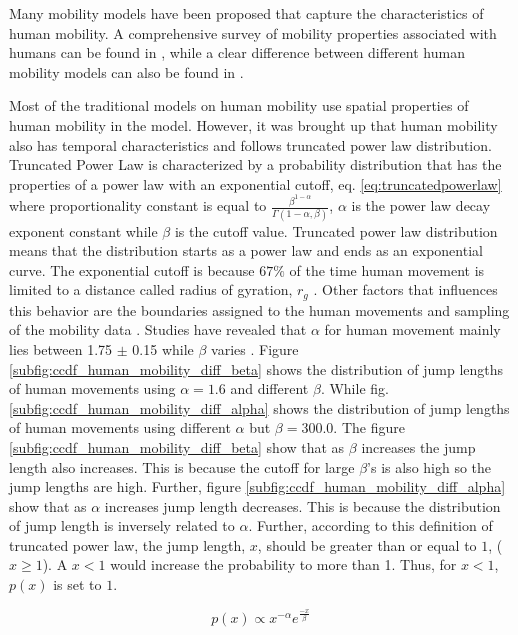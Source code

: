 \documentclass[preprint, twocolumn,5p]{elsarticle}
\begin{document}
    Many mobility models have been proposed that capture the characteristics of human mobility. A comprehensive survey of mobility properties associated with humans can be found in \cite{Karamshuk2011,Roy2011}, while a clear difference between different human mobility models can also be found in \cite{Karamshuk2011}.

    Most of the traditional models on human mobility use spatial properties of human mobility in the model. However, it was brought up that human mobility also has temporal characteristics and follows truncated power law distribution. Truncated Power Law is characterized by a probability distribution that has the properties of a power law with an exponential cutoff, eq. \ref{eq:truncatedpowerlaw} where proportionality constant is equal to $\frac{\beta^{1-\alpha}}{\Gamma(1-\alpha,\beta)}$, $\alpha$ is the power law decay exponent constant while $\beta$ is the cutoff value. Truncated power law distribution means that the distribution starts as a power law and ends as an exponential curve. The exponential cutoff is because $67\%$ of the time human movement is limited to a distance called radius of gyration, $r_{g}$ \cite{Gonzalez2008}. Other factors that influences this behavior are the boundaries assigned to the human movements and sampling of the mobility data \cite{Mossa2002}. Studies have revealed that $\alpha$ for human movement mainly lies between 1.75 $\pm$ 0.15 while $\beta$ varies \cite{Gonzalez2008}. Figure \ref{subfig:ccdf_human_mobility_diff_beta} shows the distribution of jump lengths of human movements using $\alpha=1.6$ and different $\beta$. While fig. \ref{subfig:ccdf_human_mobility_diff_alpha} shows the distribution of jump lengths of human movements using different $\alpha$ but $\beta=300.0$. The figure \ref{subfig:ccdf_human_mobility_diff_beta} show that as $\beta$ increases the jump length also increases. This is because the cutoff for large $\beta$'s is also high so the jump lengths are high. Further, figure \ref{subfig:ccdf_human_mobility_diff_alpha} show that as $\alpha$ increases jump length decreases. This is because the distribution of jump length is inversely related to $\alpha$. Further, according to this definition of truncated power law, the jump length, $x$, should be greater than or equal to $1$, ($x\geq1$). A $x<1$ would increase the probability to more than 1. Thus, for $x<1$, $p(x)$ is set to $1$.

    \begin {equation}\label{eq:truncatedpowerlaw}
        p(x)\propto x^{-\alpha}e^{\frac{-x}{\beta}}
    \end{equation}
\end{document}
